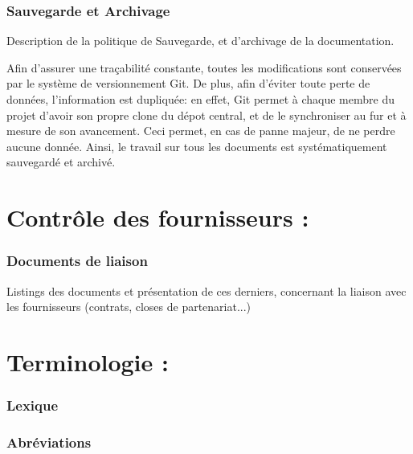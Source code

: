 \documentclass[a4paper, 18pt]{article}
\begin{document}
\section{Sauvegarde et Archivage}

Description de la politique de Sauvegarde, et d'archivage de la documentation.

Afin d'assurer une traçabilité constante, toutes les modifications sont conservées par le système de versionnement
Git. De plus, afin d'éviter toute perte de données, l'information est dupliquée: en effet, Git permet à chaque membre
du projet d'avoir son propre clone du dépot central, et de le synchroniser au fur et à mesure de son avancement.
Ceci permet, en cas de panne majeur, de ne perdre aucune donnée. Ainsi, le travail sur tous les documents est
systématiquement sauvegardé et archivé.

\part{Contrôle des fournisseurs :}

\section{Documents de liaison}

Listings des documents et présentation de ces derniers, concernant la liaison avec les fournisseurs (contrats, closes de partenariat...)

\part{Terminologie :}

\section{Lexique}

\section{Abréviations} 
\end{document}
